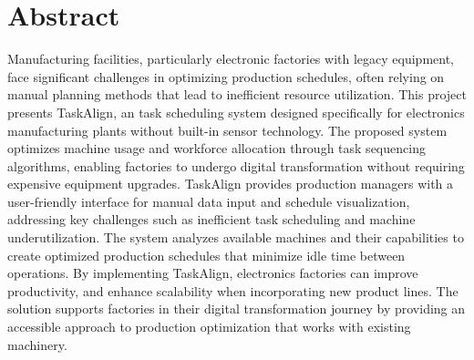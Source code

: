 \chapter*{Abstract}
\label{chap:abstract}

Manufacturing facilities, particularly electronic factories with legacy equipment, face significant challenges in optimizing production schedules, often relying on manual planning methods that lead to inefficient resource utilization. This project presents TaskAlign, an task scheduling system designed specifically for electronics manufacturing plants without built-in sensor technology. The proposed system optimizes machine usage and workforce allocation through task sequencing algorithms, enabling factories to undergo digital transformation without requiring expensive equipment upgrades.
TaskAlign provides production managers with a user-friendly interface for manual data input and schedule visualization, addressing key challenges such as inefficient task scheduling and machine underutilization. The system analyzes available machines and their capabilities to create optimized production schedules that minimize idle time between operations. By implementing TaskAlign, electronics factories can improve productivity, and enhance scalability when incorporating new product lines. The solution supports factories in their digital transformation journey by providing an accessible approach to production optimization that works with existing machinery.